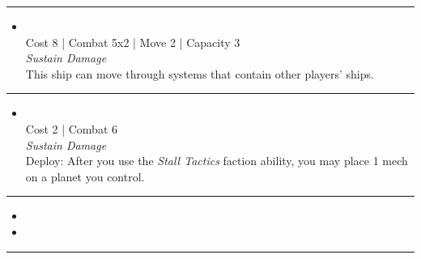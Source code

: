 \begin{multicols}{2}
\vspace{-10pt}\rule{\hsize}{0.4pt}\vspace{5pt}


\begin{itemize}
\item {}\\
Cost 8 | Combat 5x2 | Move 2 | Capacity 3 \\
\emph{Sustain Damage}\\
This ship can move through systems that contain other players' ships.
\end{itemize}

\vspace{-10pt}\rule{\hsize}{0.4pt}\vspace{5pt}


\begin{itemize}
\item {}
\\
Cost 2 | Combat 6
\\
\emph{Sustain Damage}
\\
Deploy: After you use the \emph{Stall Tactics} faction ability, you may place 1 mech on a planet you control. 
\end{itemize}

\vspace{-10pt}\rule{\hsize}{0.4pt}\vspace{5pt}

\nounits

\columnbreak
{}

\begin{itemize}
\item \transparasteel
\item \mageon
\end{itemize}

\vspace{-10pt}\rule{\hsize}{0.4pt}\vspace{5pt}



\end{multicols}
